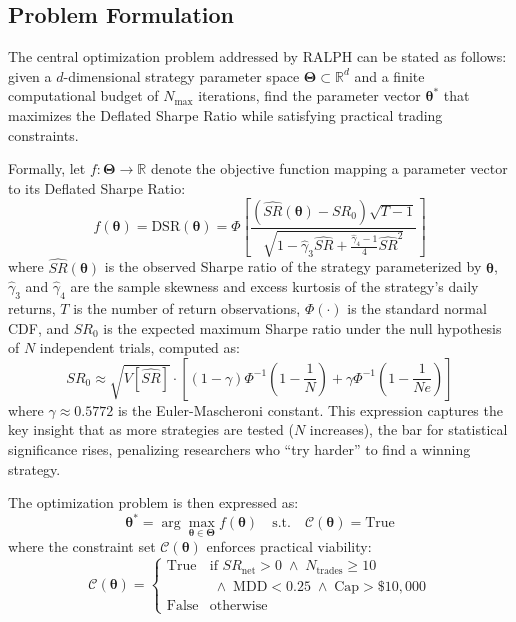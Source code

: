 \documentclass[conference]{IEEEtran}
\begin{document}
\subsection{Problem Formulation}

The central optimization problem addressed by RALPH can be stated as follows: given a $d$-dimensional strategy parameter space $\boldsymbol{\Theta} \subset \mathbb{R}^d$ and a finite computational budget of $N_{\max}$ iterations, find the parameter vector $\boldsymbol{\theta}^*$ that maximizes the Deflated Sharpe Ratio while satisfying practical trading constraints.

Formally, let $f: \boldsymbol{\Theta} \rightarrow \mathbb{R}$ denote the objective function mapping a parameter vector to its Deflated Sharpe Ratio:
\begin{equation}
    f(\boldsymbol{\theta}) = \text{DSR}(\boldsymbol{\theta}) = \Phi\left[\frac{(\widehat{SR}(\boldsymbol{\theta}) - SR_0)\sqrt{T-1}}{\sqrt{1 - \hat{\gamma}_3 \widehat{SR} + \frac{\hat{\gamma}_4 - 1}{4}\widehat{SR}^2}}\right]
    \label{eq:dsr}
\end{equation}
where $\widehat{SR}(\boldsymbol{\theta})$ is the observed Sharpe ratio of the strategy parameterized by $\boldsymbol{\theta}$, $\hat{\gamma}_3$ and $\hat{\gamma}_4$ are the sample skewness and excess kurtosis of the strategy's daily returns, $T$ is the number of return observations, $\Phi(\cdot)$ is the standard normal CDF, and $SR_0$ is the expected maximum Sharpe ratio under the null hypothesis of $N$ independent trials, computed as:
\begin{equation}
    SR_0 \approx \sqrt{V[\widehat{SR}]} \cdot \left[(1-\gamma)\Phi^{-1}\left(1 - \frac{1}{N}\right) + \gamma \Phi^{-1}\left(1 - \frac{1}{Ne}\right)\right]
    \label{eq:sr0}
\end{equation}
where $\gamma \approx 0.5772$ is the Euler-Mascheroni constant. This expression captures the key insight that as more strategies are tested ($N$ increases), the bar for statistical significance rises, penalizing researchers who ``try harder'' to find a winning strategy.

The optimization problem is then expressed as:
\begin{equation}
    \boldsymbol{\theta}^* = \arg\max_{\boldsymbol{\theta} \in \boldsymbol{\Theta}} f(\boldsymbol{\theta}) \quad \text{s.t.} \quad \mathcal{C}(\boldsymbol{\theta}) = \text{True}
    \label{eq:optimization}
\end{equation}
where the constraint set $\mathcal{C}(\boldsymbol{\theta})$ enforces practical viability:
\begin{equation}
    \mathcal{C}(\boldsymbol{\theta}) = \begin{cases}
        \text{True} & \text{if } SR_{\text{net}} > 0 \;\wedge\; N_{\text{trades}} \geq 10 \\
        & \;\wedge\; \text{MDD} < 0.25 \;\wedge\; \text{Cap} > \$10{,}000 \\
        \text{False} & \text{otherwise}
    \end{cases}
    \label{eq:constraints}
\end{equation}
\end{document}
